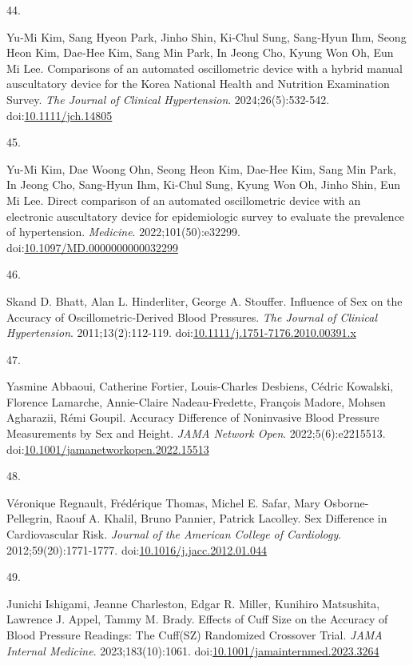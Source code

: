 \documentclass[
  12pt,
  letterpaper,
  openany,
  oneside]{book}
\newlength{\cslhangindent}
\newlength{\csllabelwidth}
\newenvironment{CSLReferences}[2] %
 {\begin{list}{}{%
  \setlength{\itemindent}{0pt}
  \setlength{\leftmargin}{0pt}
  \setlength{\parsep}{0pt}
  \ifodd #1
   \setlength{\leftmargin}{\cslhangindent}
   \setlength{\itemindent}{-1\cslhangindent}
  \fi
  \setlength{\itemsep}{#2\baselineskip}}}
 {\end{list}}
\newcommand{\CSLLeftMargin}[1]{\parbox[t]{\csllabelwidth}{\strut#1\strut}}
\newcommand{\CSLRightInline}[1]{\parbox[t]{\linewidth - \csllabelwidth}{\strut#1\strut}}
\begin{document}
\begin{CSLReferences}{0}{1}
\CSLLeftMargin{44. }%
\CSLRightInline{Yu‐Mi Kim, Sang Hyeon Park, Jinho Shin, Ki‐Chul Sung,
Sang‐Hyun Ihm, Seong Heon Kim, Dae‐Hee Kim, Sang Min Park, In Jeong Cho,
Kyung Won Oh, Eun Mi Lee. Comparisons of an automated oscillometric
device with a hybrid manual auscultatory device for the {Korea}
{National} {Health} and {Nutrition} {Examination} {Survey}. \emph{The
Journal of Clinical Hypertension}. 2024;26(5):532-542.
doi:\href{https://doi.org/10.1111/jch.14805}{10.1111/jch.14805}}

\CSLLeftMargin{45. }%
\CSLRightInline{Yu-Mi Kim, Dae Woong Ohn, Seong Heon Kim, Dae-Hee Kim,
Sang Min Park, In Jeong Cho, Sang-Hyun Ihm, Ki-Chul Sung, Kyung Won Oh,
Jinho Shin, Eun Mi Lee. Direct comparison of an automated oscillometric
device with an electronic auscultatory device for epidemiologic survey
to evaluate the prevalence of hypertension. \emph{Medicine}.
2022;101(50):e32299.
doi:\href{https://doi.org/10.1097/MD.0000000000032299}{10.1097/MD.0000000000032299}}

\CSLLeftMargin{46. }%
\CSLRightInline{Skand D. Bhatt, Alan L. Hinderliter, George A. Stouffer.
Influence of {Sex} on the {Accuracy} of {Oscillometric}‐{Derived}
{Blood} {Pressures}. \emph{The Journal of Clinical Hypertension}.
2011;13(2):112-119.
doi:\href{https://doi.org/10.1111/j.1751-7176.2010.00391.x}{10.1111/j.1751-7176.2010.00391.x}}

\CSLLeftMargin{47. }%
\CSLRightInline{Yasmine Abbaoui, Catherine Fortier, Louis-Charles
Desbiens, Cédric Kowalski, Florence Lamarche, Annie-Claire
Nadeau-Fredette, François Madore, Mohsen Agharazii, Rémi Goupil.
Accuracy {Difference} of {Noninvasive} {Blood} {Pressure} {Measurements}
by {Sex} and {Height}. \emph{JAMA Network Open}. 2022;5(6):e2215513.
doi:\href{https://doi.org/10.1001/jamanetworkopen.2022.15513}{10.1001/jamanetworkopen.2022.15513}}

\CSLLeftMargin{48. }%
\CSLRightInline{Véronique Regnault, Frédérique Thomas, Michel E. Safar,
Mary Osborne-Pellegrin, Raouf A. Khalil, Bruno Pannier, Patrick
Lacolley. Sex {Difference} in {Cardiovascular} {Risk}. \emph{Journal of
the American College of Cardiology}. 2012;59(20):1771-1777.
doi:\href{https://doi.org/10.1016/j.jacc.2012.01.044}{10.1016/j.jacc.2012.01.044}}

\CSLLeftMargin{49. }%
\CSLRightInline{Junichi Ishigami, Jeanne Charleston, Edgar R. Miller,
Kunihiro Matsushita, Lawrence J. Appel, Tammy M. Brady. Effects of
{Cuff} {Size} on the {Accuracy} of {Blood} {Pressure} {Readings}: {The}
{Cuff}({SZ}) {Randomized} {Crossover} {Trial}. \emph{JAMA Internal
Medicine}. 2023;183(10):1061.
doi:\href{https://doi.org/10.1001/jamainternmed.2023.3264}{10.1001/jamainternmed.2023.3264}}


\end{CSLReferences}
\end{document}
